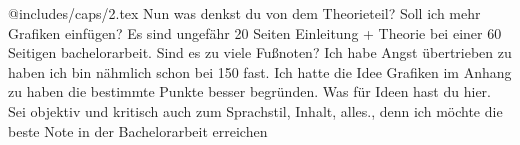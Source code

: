 @includes/caps/2.tex Nun was denkst du von dem Theorieteil? Soll ich mehr Grafiken einfügen? Es sind ungefähr 20 Seiten Einleitung + Theorie bei einer 60 Seitigen bachelorarbeit. Sind es zu viele Fußnoten? Ich habe Angst übertrieben zu haben ich bin nähmlich schon bei 150 fast. Ich hatte die Idee Grafiken im Anhang zu haben die bestimmte Punkte besser begründen. Was für Ideen hast du hier. Sei objektiv und kritisch auch zum Sprachstil, Inhalt, alles., denn ich möchte die beste Note in der Bachelorarbeit erreichen